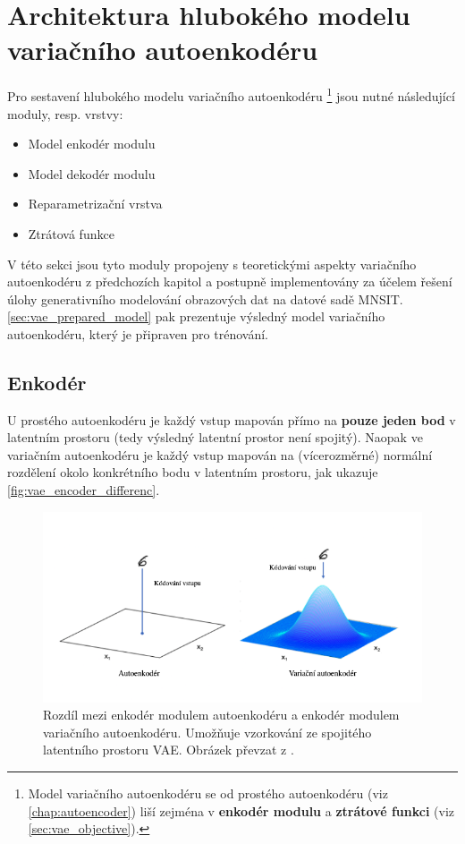 \section{Architektura hlubokého modelu variačního autoenkodéru}
Pro sestavení hlubokého modelu variačního autoenkodéru
\footnote{Model variačního autoenkodéru se od prostého autoenkodéru (viz \autoref{chap:autoencoder}) liší zejména v \textbf{enkodér modulu} a \textbf{ztrátové funkci} (viz \autoref{sec:vae_objective}).} jsou nutné následující moduly, resp. vrstvy:
\begin{itemize}
    \item Model enkodér modulu
    \item Model dekodér modulu
    \item Reparametrizační vrstva
    \item Ztrátová funkce
\end{itemize}

V této sekci jsou tyto moduly propojeny s teoretickými aspekty variačního autoenkodéru z předchozích kapitol a postupně implementovány za účelem řešení úlohy generativního modelování obrazových dat na datové sadě MNSIT.
\autoref{sec:vae_prepared_model} pak prezentuje výsledný model variačního autoenkodéru, který je připraven pro trénování.

\subsection{Enkodér}
U prostého autoenkodéru je každý vstup mapován přímo na \textbf{pouze jeden bod} v latentním prostoru (tedy výsledný latentní prostor není spojitý).
Naopak ve variačním autoenkodéru je každý vstup mapován na (vícerozměrné) normální rozdělení okolo konkrétního bodu v latentním prostoru, jak ukazuje \autoref{fig:vae_encoder_differenc}.

\begin{figure}[H]
    \centering
    \includegraphics[width=\textwidth]{figures/vae_encoder_module.png}
    \caption{Rozdíl mezi enkodér modulem autoenkodéru a enkodér modulem variačního autoenkodéru. Umožňuje vzorkování ze spojitého latentního prostoru VAE. Obrázek převzat z \textcite{Foster2023}.}
    \label{fig:vae_encoder_difference}
\end{figure}

